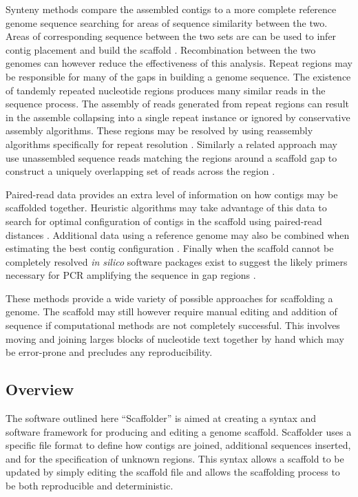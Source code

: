 \documentclass[10pt]{bmc_article}
\newenvironment{bmcformat}{\begin{raggedright}\baselineskip20pt\sloppy\setboolean{publ}{false}}{\end{raggedright}\baselineskip20pt\sloppy}
\begin{document}
\begin{bmcformat}
Synteny methods compare the assembled contigs to a more complete reference
genome sequence searching for areas of sequence similarity between the two.
Areas of corresponding sequence between the two sets are can be used to infer
contig placement and build the scaffold \cite{richter2007,zhao2008,assefa2009}.
Recombination between the two genomes can however reduce the effectiveness of
this analysis. Repeat regions may be responsible for many of the gaps in
building a genome sequence. The existence of tandemly repeated nucleotide
regions produces many similar reads in the sequence process. The assembly of
reads generated from repeat regions can result in the assemble collapsing into
a single repeat instance or ignored by conservative assembly algorithms. These
regions may be resolved by using reassembly algorithms specifically for repeat
resolution \cite{mulyukov2002,koren2010}. Similarly a related approach may use
unassembled sequence reads matching the regions around a scaffold gap to
construct a uniquely overlapping set of reads across the region
\cite{tsai2010}. \pb

Paired-read data provides an extra level of information on how contigs may be
scaffolded together. Heuristic algorithms may take advantage of this data to
search for optimal configuration of contigs in the scaffold using paired-read
distances \cite{dayarian2010,boetzer2011}. Additional data using a reference
genome may also be combined when estimating the best contig configuration
\cite{pop2004}. Finally when the scaffold cannot be completely resolved
\emph{in silico} software packages exist to suggest the likely primers
necessary for PCR amplifying the sequence in gap regions
\cite{gordon2001,nagarajan2010}. \pb

These methods provide a wide variety of possible approaches for scaffolding
a genome. The scaffold may still however require manual editing and addition of
sequence if computational methods are not completely successful. This involves
moving and joining larges blocks of nucleotide text together by hand which may
be error-prone and precludes any reproducibility. \pb

\subsection*{Overview} %

The software outlined here ``Scaffolder'' is aimed at creating a syntax and
software framework for producing and editing a genome scaffold. Scaffolder uses
a specific file format to define how contigs are joined, additional sequences
inserted, and for the specification of unknown regions. This syntax allows
a scaffold to be updated by simply editing the scaffold file and allows the
scaffolding process to be both reproducible and deterministic. \pb


\end{bmcformat}
\end{document}
